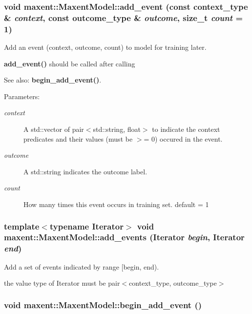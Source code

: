 \subsubsection{\setlength{\rightskip}{0pt plus 5cm}void maxent::Maxent\-Model::add\_\-event (const context\_\-type \& {\em context}, const outcome\_\-type \& {\em outcome}, size\_\-t {\em count} = 1)}\label{classmaxent_1_1MaxentModel_a7}


Add an event (context, outcome, count) to model for training later. 

{\bf add\_\-event()} should be called after calling \begin{Desc}
\item[See also:]{\bf begin\_\-add\_\-event()}. \end{Desc}
\begin{Desc}
\item[Parameters:]
\begin{description}
\item[{\em context}]A std::vector of pair$<$std::string, float$>$ to indicate the context predicates and their values (must be $>$= 0) occured in the event. \item[{\em outcome}]A std::string indicates the outcome label. \item[{\em count}]How many times this event occurs in training set. default = 1 \end{description}
\end{Desc}
\subsubsection{\setlength{\rightskip}{0pt plus 5cm}template$<$typename Iterator$>$ void maxent::Maxent\-Model::add\_\-events (Iterator {\em begin}, Iterator {\em end})\hspace{0.3cm}{\tt  [inline]}}\label{classmaxent_1_1MaxentModel_a14}


Add a set of events indicated by range [begin, end). 

the value type of Iterator must be pair$<$context\_\-type, outcome\_\-type$>$ 
\subsubsection{\setlength{\rightskip}{0pt plus 5cm}void maxent::Maxent\-Model::begin\_\-add\_\-event ()}\label{classmaxent_1_1MaxentModel_a6}


